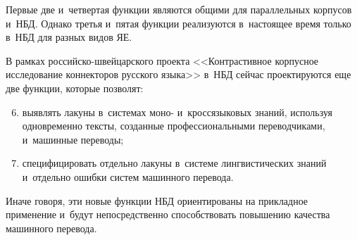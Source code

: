 \begin{multicols}{2}
  Первые две и~четвертая функции являются общими для параллельных 
корпусов и~НБД. Однако третья и~пятая функции реализуются в~настоящее 
время только в~НБД для разных видов ЯЕ.
  
  В рамках российско-швей\-цар\-ско\-го проекта <<Контрастивное 
корпусное исследование коннекторов русского языка>> в~НБД сейчас 
проектируются еще две функции, которые позволят:
  \begin{enumerate}[(1)]
\setcounter{enumi}{5}
\item выявлять лакуны в~системах моно- и~кросс\-язы\-ко\-вых знаний, 
используя одновременно тексты, созданные профессиональными 
переводчиками, и~машинные переводы;
\item специфицировать отдельно лакуны в~системе лингвистических 
знаний и~отдельно ошибки систем машинного перевода.
\end{enumerate}

  Иначе говоря, эти новые функции НБД ориентированы на прикладное 
применение и~будут непосредственно способствовать повышению качества 
машинного перевода.
  

\end{multicols}
